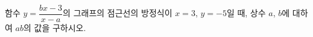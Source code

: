 \hspace*{2mm}\begin{minipage}[t]{\dimexpr\linewidth-2mm\relax}\vspace{0pt}
함수 $y=\dfrac{bx-3}{x-a}$의 그래프의 점근선의 방정식이 $x=3$, $y=-5$일 때, 상수 $a$, $b$에 대하여 $ab$의 값을 구하시오.\end{minipage}
